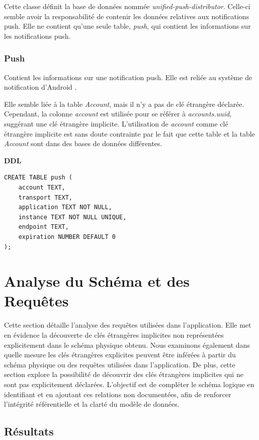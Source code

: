 \documentclass[a4paper,11pt]{article}
\begin{document}
Cette classe définit la base de données nommée \textit{unified-push-distributor}. Celle-ci semble avoir la responsabilité de contenir les données relatives aux notifications push. Elle ne contient qu'une seule table, \textit{push}, qui contient les informations sur les notifications push.

\subsubsection*{Push}

Contient les informations sur une notification push. Elle est reliée au système de notification d'Android .

Elle semble liée à la table \textit{Account}, mais il n'y a pas de clé étrangère déclarée. Cependant, la colonne \textit{account} est utilisée pour se référer à \textit{accounts.uuid}, suggérant une clé étrangère implicite. L'utilisation de \textit{account} comme clé étrangère implicite est sans doute contrainte par le fait que cette table et la table \textit{Account} sont dans des bases de données différentes.

\textbf{DDL}
\begin{lstlisting}
CREATE TABLE push (
	account TEXT,
	transport TEXT,
	application TEXT NOT NULL,
	instance TEXT NOT NULL UNIQUE,
	endpoint TEXT,
	expiration NUMBER DEFAULT 0
);
\end{lstlisting}

\section*{Analyse du Schéma et des Requêtes}
Cette section détaille  l'analyse des requêtes utilisées dans l'application. Elle met en évidence la découverte de clés étrangères implicites non représentées explicitement dans le schéma physique obtenu. Nous examinons également dans quelle mesure les clés étrangères explicites peuvent être inférées à partir du schéma physique ou des requêtes utilisées dans l'application. De plus, cette section explore la possibilité de découvrir des clés étrangères implicites qui ne sont pas explicitement déclarées. L'objectif est de compléter le schéma logique en identifiant et en ajoutant ces relations non documentées, afin de renforcer l'intégrité référentielle et la clarté du modèle de données.

\subsection*{Résultats}
\end{document}
